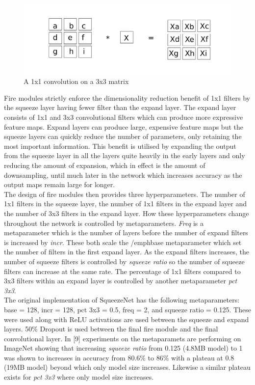 \documentclass{article}
\begin{document}
\begin{figure}[h]
  \includegraphics[width=\linewidth]{convonebyone.pdf}
  \caption{A 1x1 convolution on a 3x3 matrix}
  \label{fig:conv1x1}
\end{figure}

Fire modules strictly enforce the dimensionality reduction benefit of 1x1 filters by the squeeze layer having fewer filter than the expand layer. The expand layer consists of 1x1 and 3x3 convolutional filters which can produce more expressive feature maps. Expand layers can produce large, expensive feature maps but the squeeze layers can quickly reduce the number of parameters, only retaining the most important information. This benefit is utilised by expanding the output from the squeeze layer in all the layers quite heavily in the early layers and only reducing the amount of expansion, which in effect is the amount of downsampling, until much later in the network which increases accuracy as the output maps remain large for longer.\\

The design of fire modules then provides three hyperparameters. The number of 1x1 filters in the squeeze layer, the number of 1x1 filters in the expand layer and the number of 3x3 filters in the expand layer. How these hyperparameters change throughout the network is controlled by metaparameters. \emph{Freq} is a metaparameter which is the number of layers before the number of expand filters is increased by \emph{incr}. These both scale the /emph{base} metaparameter which set the number of filters in the first expand layer. As the expand filters increases, the number of squeeze filters is controlled by \emph{squeeze ratio} so the number of squeeze filters can increase at the same rate. The percentage of 1x1 filters compared to 3x3 filters within an expand layer is controlled by another metaparameter \emph{pct 3x3}. \\

The original implementation of SqueezeNet has the following metaparameters: base = 128, incr = 128, pct 3x3 = 0.5, freq = 2, and squeeze ratio = 0.125. These were used along with ReLU activations are used between the squeeze and expand layers. 50\% Dropout is used between the final fire module and the final convolutional layer. In [9] experiments on the metaparamets are performing on ImageNet showing that increasing \emph{squeeze ratio} from 0.125 (4.8MB model) to 1 was shown to increases in accuracy from 80.6\% to 86\% with a plateau at 0.8 (19MB model) beyond which only model size increases. Likewise a similar plateau exists for \emph{pct 3x3} where only model size increases.\\
\end{document}
